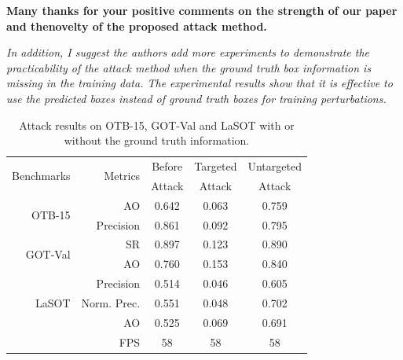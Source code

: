 \documentclass[12pt]{article}
\begin{document}
\textbf{Many thanks for your positive comments on the strength of our paper and thenovelty of the proposed attack method.}

\textit{In addition, I suggest the authors add more experiments to demonstrate the practicability of the attack method when the ground truth box information is missing in the training data. The experimental results show that it is effective to use the predicted boxes instead of ground truth boxes for training perturbations.}

\begin{table}[t]
  \centering
  \caption{Attack results on OTB-15, GOT-Val and LaSOT with or without the ground truth information.}
  \begin{tabular}{rrccc}
  \toprule
  \multirow{2}{*}{Benchmarks} & \multirow{2}{*}{Metrics} & Before    & Targeted & Untargeted  \\
                            &                         & Attack & Attack & Attack     \\ 
  \midrule
  \multirow{2}{*}{OTB-15} 
  & AO   & 0.642 & 0.063 & 0.759\\
  & Precision & 0.861 & 0.092 & 0.795\\
  \midrule
  \multirow{2}{*}{GOT-Val} 
  & SR & 0.897 & 0.123 & 0.890\\
  & AO & 0.760 & 0.153 & 0.840 \\
  \midrule
  \multirow{3}{*}{LaSOT} 
  & Precision  & 0.514 & 0.046 & 0.605\\
  & Norm. Prec.& 0.551 & 0.048 & 0.702\\
  & AO         & 0.525 & 0.069 & 0.691\\
  \midrule
  \multicolumn{2}{r}{FPS} & 58 & 58 & 58\\
  \bottomrule
  \end{tabular}
  \label{tab:benchmark results}
\end{table}
\end{document}
